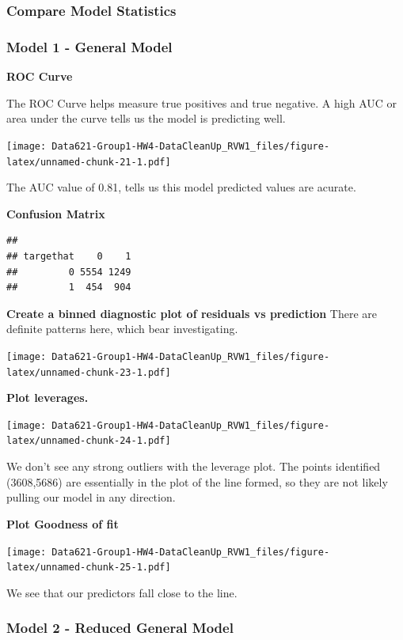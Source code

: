 \documentclass[]{article}
\begin{document}
\subsubsection{Compare Model Statistics}\label{compare-model-statistics}

\subsubsection{Model 1 - General Model}\label{model-1---general-model}

\textbf{ROC Curve}

The ROC Curve helps measure true positives and true negative. A high AUC
or area under the curve tells us the model is predicting well.

\texttt{[image: Data621-Group1-HW4-DataCleanUp\_RVW1\_files/figure-latex/unnamed-chunk-21-1.pdf]}

The AUC value of 0.81, tells us this model predicted values are acurate.

\textbf{Confusion Matrix}

\begin{verbatim}
##          
## targethat    0    1
##         0 5554 1249
##         1  454  904
\end{verbatim}

\textbf{Create a binned diagnostic plot of residuals vs prediction}
There are definite patterns here, which bear investigating.

\texttt{[image: Data621-Group1-HW4-DataCleanUp\_RVW1\_files/figure-latex/unnamed-chunk-23-1.pdf]}

\textbf{Plot leverages.}

\texttt{[image: Data621-Group1-HW4-DataCleanUp\_RVW1\_files/figure-latex/unnamed-chunk-24-1.pdf]}

We don't see any strong outliers with the leverage plot. The points
identified (3608,5686) are essentially in the plot of the line formed,
so they are not likely pulling our model in any direction.

\textbf{Plot Goodness of fit}

\texttt{[image: Data621-Group1-HW4-DataCleanUp\_RVW1\_files/figure-latex/unnamed-chunk-25-1.pdf]}

We see that our predictors fall close to the line.

\subsubsection{Model 2 - Reduced General
Model}\label{model-2---reduced-general-model}
\end{document}
